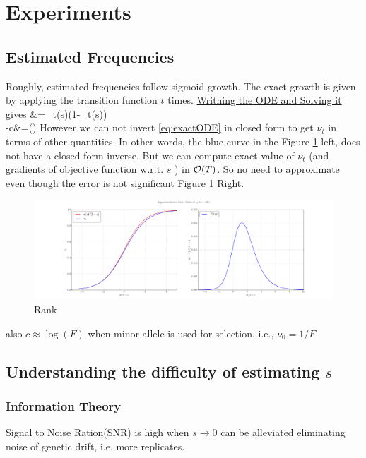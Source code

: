 \section{Experiments}
\subsection{Estimated Frequencies}
Roughly, estimated frequencies follow sigmoid growth. The exact growth is given by applying the transition function $t$ times.
\href{http://www.wolframalpha.com/input/?i=dx%2Fdt+%3D+s%2F2+%28x%281-x%29%29+%281%2F%281%2Bsx%29%29}{Writhing the ODE and Solving it gives}%
\beqn
   &=\nu_t(s)(1-\nu_t(s)) \\
  -c&=\log\left(\right)   \label{eq:eactODE}
\eeqn
However we can not invert \ref{eq:exactODE} in closed form to get $\nu_t$ in terms of other quantities. In other words, the blue curve in the Figure \ref{fig:sigmoid} left, does not have a closed form inverse. But we can compute exact value of $\nu_t$ (and gradients of objective function w.r.t. $s$ ) in ${\cal O}(T)$. So no need to approximate even though the error is not significant Figure \ref{fig:sigmoid} Right.

\begin{figure}[H]
  \centering
    \includegraphics[width=\textwidth]{apprx}
  \caption{Rank}
  \label{fig:sigmoid}
\end{figure}

also $c \approx  \log(F)$ when minor allele is used for selection, i.e., $\nu_0=1/F$

\subsection{Understanding the difficulty of estimating $s$}
\subsubsection{Information Theory}
Signal to Noise Ration(SNR) is high when $s \rightarrow 0$ can be alleviated eliminating noise of genetic drift, i.e.  more replicates. 

